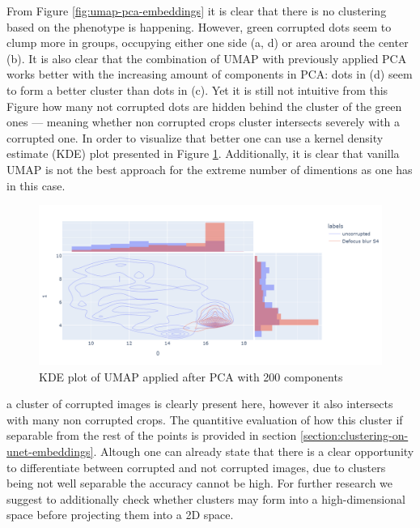 From Figure \ref{fig:umap-pca-embeddings} it is clear that there is no clustering based on the phenotype is happening. However, green corrupted dots seem to clump more in groups, occupying either one side (a, d) or area around the center (b). It is also clear that the combination of UMAP with previously applied PCA works better with the increasing amount of components in PCA: dots in (d) seem to form a better cluster than dots in (c). Yet it is still not intuitive from this Figure how many not corrupted dots are hidden behind the cluster of the green ones --- meaning whether non corrupted crops cluster intersects severely with a corrupted one. In order to visualize that better one can use a kernel density estimate (KDE) plot presented in Figure \ref{fig:kde}. Additionally, it is clear that vanilla UMAP is not the best approach for the extreme number of dimentions as one has in this case.

\begin{figure}[htb]
	\begin{center}
		\includegraphics[width=0.6\linewidth]{bilder/unet-embeddings/kde.png}
	\caption{KDE plot of UMAP applied after PCA with 200 components}\label{fig:kde}
	\end{center}
\end{figure}

a cluster of corrupted images is clearly present here, however it also intersects with many non corrupted crops. The quantitive evaluation of how this cluster if separable from the rest of the points is provided in section \ref{section:clustering-on-unet-embeddings}. Altough one can already state that there is a clear opportunity to differentiate between corrupted and not corrupted images, due to clusters being not well separable the accuracy cannot be high. For further research we suggest to additionally check whether clusters may form into a high-dimensional space before projecting them into a 2D space. 
